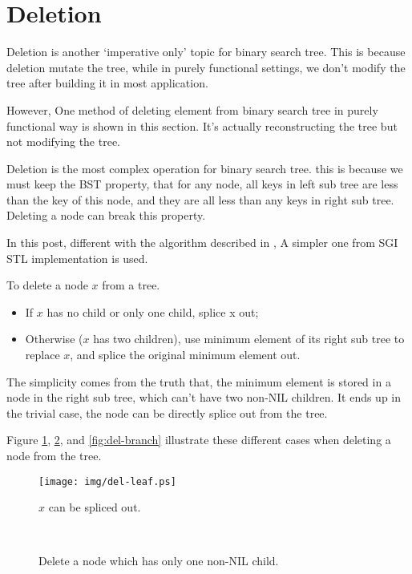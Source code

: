 \documentclass[b5paper]{article}
\begin{document}
\section{Deletion}
Deletion is another `imperative only' topic for binary search tree.
This is because deletion mutate the tree, while in purely functional
settings, we don't modify the tree after building it in most
application.

However, One method of deleting element from binary search
tree in purely functional way is shown in this section. It's actually
reconstructing the tree but not modifying the tree.

Deletion is the most complex operation for binary search tree.
this is because we must keep the BST property, that for any node,
all keys in left sub tree are less than the key of this node, and
they are all less than any keys in right sub tree. Deleting a node
can break this property.

In this post, different with the algorithm described in \cite{CLRS},
A simpler one from SGI STL implementation is used.\cite{sgi-stl}

To delete a node $x$ from a tree.
\begin{itemize}
\item If $x$ has no child or only one child, splice x out;
\item Otherwise ($x$ has two children), use minimum element of its right sub tree to replace $x$, and splice the original minimum element out.
\end{itemize}

The simplicity comes from the truth that, the minimum element is stored
in a node in the right sub tree, which can't have two non-NIL children.
It ends up in the trivial case, the node can be directly splice
out from the tree.

Figure \ref{fig:del-leaf}, \ref{fig:del-1child}, and \ref{fig:del-branch}
illustrate these different cases when deleting a node from the tree.

\begin{figure}[htbp]
  \centering
  \texttt{[image: img/del-leaf.ps]}
  \caption{$x$ can be spliced out.} \label{fig:del-leaf}
\end{figure}

\begin{figure}[htbp]
  \centering
   \\
  \caption{Delete a node which has only one non-NIL child.}
  \label{fig:del-1child}
\end{figure}
\end{document}
